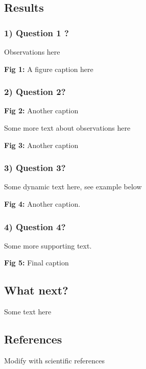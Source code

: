 \documentclass[
  letterpaper,
  DIV=11,
  numbers=noendperiod]{scrartcl}
\begin{document}
\subsection{Results}\label{results}

\subsubsection{1) Question 1 ?}\label{question-1}

Observations here

\textbf{Fig 1:} A figure caption here

\subsubsection{2) Question 2?}\label{question-2}

\textbf{Fig 2:} Another caption

Some more text about observations here

\textbf{Fig 3:} Another caption

\subsubsection{3) Question 3?}\label{question-3}

Some dynamic text here, see example below

\textbf{Fig 4:} Another caption.

\subsubsection{4) Question 4?}\label{question-4}

Some more supporting text.

\textbf{Fig 5:} Final caption

\subsection{What next?}\label{what-next}

Some text here

\subsection{References}\label{references}

Modify with scientific references
\end{document}
